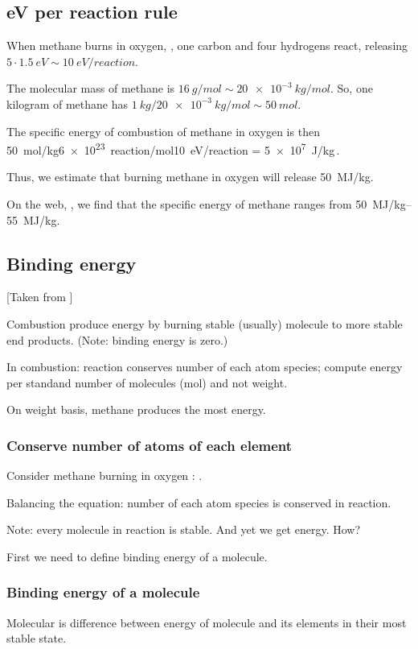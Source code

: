 \subsection*{eV per reaction rule}
%
When methane burns in oxygen, , one carbon and four hydrogens react, releasing $5\cdot\SI{1.5}{eV}\sim\SI{10}{eV/reaction}$. 

The molecular mass of methane is $\SI{16}{g/mol}\sim\SI{20e-3}{kg/mol}$. So, one kilogram of methane has $\SI{1}{kg}/\SI{20e-3}{kg/mol}\sim\SI{50}{mol}$.

The specific energy of combustion of methane in oxygen is then
%
\beq
    \SI{50}{mol/kg}\cdot\SI{6e23}{reaction/mol}\cdot\SI{10}{eV/reaction} = \SI{5e7}{J/kg}\,.
\eeq

Thus, we estimate that burning methane in oxygen will release \SI{50}{MJ/kg}.

On the web, \citep{elert:methane}, we find that the specific energy of methane ranges from \SIrange{50}{55}{MJ/kg}.


\subsection*{Binding energy}
%
[Taken from \citep{ohiostate:combustion}]

Combustion produce energy by burning stable (usually) molecule to more stable end products. (Note:  binding energy is zero.)

In combustion: reaction conserves number of each atom species; compute energy per standand number of molecules (mol) and not weight.

On weight basis, methane produces the most energy.


\subsubsection*{Conserve number of atoms of each element}
%
Consider methane  burning in oxygen : .

Balancing the equation: number of each atom species is conserved in reaction.

Note: every molecule in reaction is stable. And yet we get energy. How?

First we need to define binding energy of a molecule.


\subsubsection*{Binding energy of a molecule}
%
Molecular  is difference between energy of molecule and its elements in their most stable state.

